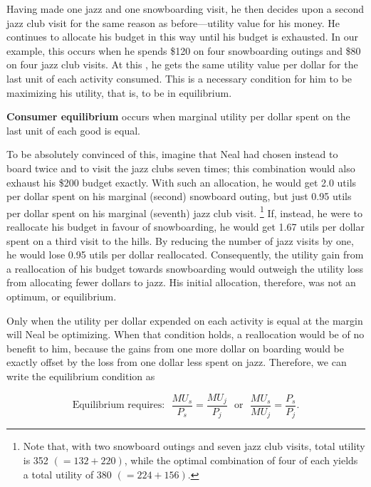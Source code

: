 Having made one jazz and one snowboarding visit, he then decides upon a
second jazz club visit for the same reason as before---utility value for his
money. He continues to allocate his budget in this way until his budget is
exhausted. In our example, this occurs when he spends \$120 on four
snowboarding outings and \$80 on four jazz club visits. At this %
, he gets the same utility value per
dollar for the last unit of each activity consumed. This is a necessary
condition for him to be maximizing his utility, that is, to be in
equilibrium.

\begin{DefBox}
	\textbf{Consumer equilibrium} occurs when marginal utility per dollar spent on the last unit of each good is equal.
\end{DefBox}

\newhtmlpage

To be absolutely convinced of this, imagine that Neal had chosen instead to
board twice and to visit the jazz clubs seven times; this combination would
also exhaust his \$200 budget exactly. With such an allocation, he would get
2.0 utils per dollar spent on his marginal (second) snowboard outing, but
just 0.95 utils per dollar spent on his marginal (seventh) jazz club visit.%
\footnote{Note that, with two snowboard outings and seven jazz club visits, total
	utility is 352 $(=132+220)$, while the optimal combination of four of each
	yields a total utility of 380 $(=224+156)$.} If, instead, he were to
reallocate his budget in favour of snowboarding, he would get 1.67 utils per
dollar spent on a third visit to the hills. By reducing the number of jazz
visits by one, he would lose 0.95 utils per dollar reallocated.
Consequently, the utility gain from a reallocation of his budget towards
snowboarding would outweigh the utility loss from allocating fewer dollars
to jazz. His initial allocation, therefore, was not an optimum, or
equilibrium.

Only when the utility per dollar expended on each activity is equal at the
margin will Neal be optimizing. When that condition holds, a reallocation
would be of no benefit to him, because the gains from one more dollar on
boarding would be exactly offset by the loss from one dollar less spent on
jazz. Therefore, we can write the equilibrium condition as

\begin{equation}\label{eq:utilequilibriumcondition}
	\mbox{Equilibrium requires:~~}\frac{MU_{s}}{P_{s}}=\frac{MU_{j}}{P_{j}}\mbox{~~or~~}\frac{MU_{s}}{MU_{j}}=\frac{P_{s}}{P_{j}}. 
\end{equation}

